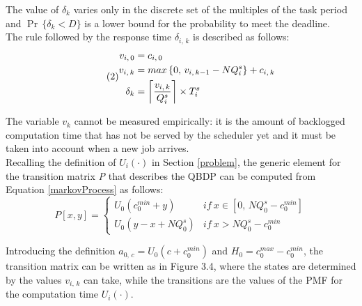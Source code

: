 The value of \( \delta_{k} \) varies only in the discrete set of the multiples of the task period and \( \Pr\,\{\delta_{k} < D\} \) is a lower bound for the probability to meet the deadline.\\
The rule followed by the response time \( \delta_{i,\,k} \) is described as follows:
\begin{equation} \tag{2} \label{markovProcess}
\begin{split}
  v_{i,\,0} &= c_{i,\,0}\\
  v_{i,\,k} &= max\,\{0,\,v_{i,\,k-1} - NQ_{i}^{s}\} + c_{i,\,k}\\
  \delta_{k} &= \ceil[\bigg]{\frac{v_{i,\,k}}{Q_{i}^{s}}} \times T_{i}^{s}
\end{split}
\end{equation}

The variable \( v_{k} \) cannot be measured empirically: it is the amount of backlogged computation time that has not be served by the scheduler yet and it must be taken into account when a new job arrives.\\
Recalling the definition of \( U_{i}(\cdot) \) in Section \ref{problem}, the generic element for the transition matrix \emph{P} that describes the QBDP can be computed from Equation \ref{markovProcess} as follows:
\begin{equation*}
  P[x,y] = 
  \begin{cases}
    U_{0}(c_{0}^{min}+y) & {if\ } x \in [0,\,NQ_{0}^{s}-c_{0}^{min}] \\
    U_{0}(y-x+NQ_{0}^{s}) & {if\ } x > NQ_{0}^{s}-c_{0}^{min}
  \end{cases}
\end{equation*}

Introducing the definition \( a_{0,\,c} = U_{0}(c+c_{0}^{min}) \) and \( H_{0} = c_{0}^{max} - c_{0}^{min} \), the transition matrix can be written as in Figure 3.4, where the states are determined by the values \( v_{i,\,k} \) can take, while the transitions are the values of the PMF for the computation time \( U_{i}(\cdot) \).

